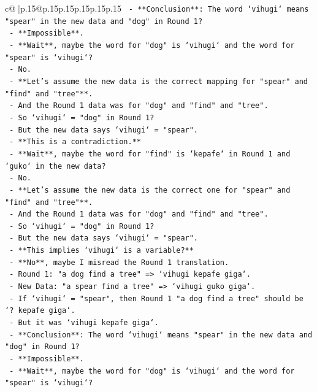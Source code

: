 \documentclass{article}
\begin{document}
{\begin{supertabular}{c@{$\;$}|p{.15\linewidth}@{}p{.15\linewidth}p{.15\linewidth}p{.15\linewidth}p{.15\linewidth}p{.15\linewidth}}
{{{\texttt{    {-} **Conclusion**: The word `vihugi` means "spear" in the new data and "dog" in Round 1?} \\
\texttt{    {-} **Impossible**.} \\
\texttt{    {-} **Wait**, maybe the word for "dog" is `vihugi` and the word for "spear" is `vihugi`?} \\
\texttt{    {-} No.} \\
\texttt{    {-} **Let's assume the new data is the correct mapping for "spear" and "find" and "tree"**.} \\
\texttt{    {-} And the Round 1 data was for "dog" and "find" and "tree".} \\
\texttt{    {-} So `vihugi` = "dog" in Round 1?} \\
\texttt{    {-} But the new data says `vihugi` = "spear".} \\
\texttt{    {-} **This is a contradiction.**} \\
\texttt{    {-} **Wait**, maybe the word for "find" is `kepafe` in Round 1 and `guko` in the new data?} \\
\texttt{    {-} No.} \\
\texttt{    {-} **Let's assume the new data is the correct one for "spear" and "find" and "tree"**.} \\
\texttt{    {-} And the Round 1 data was for "dog" and "find" and "tree".} \\
\texttt{    {-} So `vihugi` = "dog" in Round 1?} \\
\texttt{    {-} But the new data says `vihugi` = "spear".} \\
\texttt{    {-} **This implies `vihugi` is a variable?**} \\
\texttt{    {-} **No**, maybe I misread the Round 1 translation.} \\
\texttt{    {-} Round 1: "a dog find a tree" => `vihugi kepafe giga`.} \\
\texttt{    {-} New Data: "a spear find a tree" => `vihugi guko giga`.} \\
\texttt{    {-} If `vihugi` = "spear", then Round 1 "a dog find a tree" should be `? kepafe giga`.} \\
\texttt{    {-} But it was `vihugi kepafe giga`.} \\
\texttt{    {-} **Conclusion**: The word `vihugi` means "spear" in the new data and "dog" in Round 1?} \\
\texttt{    {-} **Impossible**.} \\
\texttt{    {-} **Wait**, maybe the word for "dog" is `vihugi` and the word for "spear" is `vihugi`?} \\
}}}
\end{supertabular}}
\end{document}
